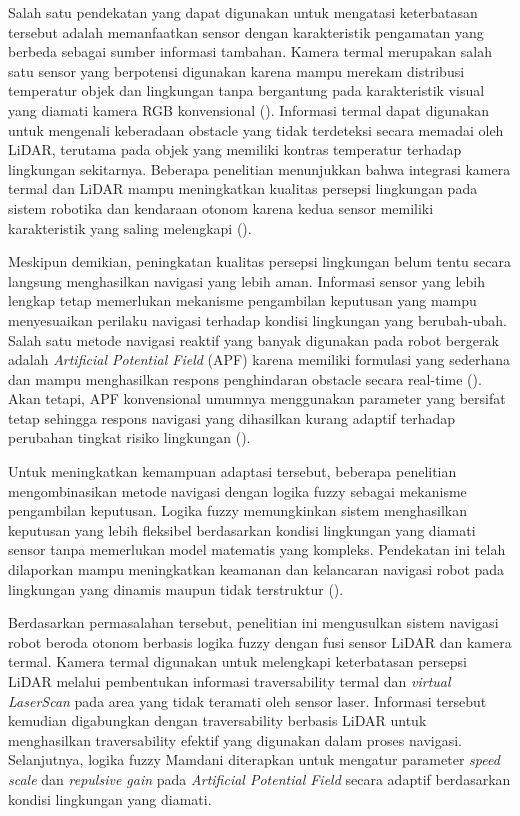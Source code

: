 Salah satu pendekatan yang dapat digunakan untuk mengatasi keterbatasan tersebut adalah memanfaatkan sensor dengan karakteristik pengamatan yang berbeda sebagai sumber informasi tambahan. Kamera termal merupakan salah satu sensor yang berpotensi digunakan karena mampu merekam distribusi temperatur objek dan lingkungan tanpa bergantung pada karakteristik visual yang diamati kamera RGB konvensional (\cite{Castro2016}). Informasi termal dapat digunakan untuk mengenali keberadaan obstacle yang tidak terdeteksi secara memadai oleh LiDAR, terutama pada objek yang memiliki kontras temperatur terhadap lingkungan sekitarnya. Beberapa penelitian menunjukkan bahwa integrasi kamera termal dan LiDAR mampu meningkatkan kualitas persepsi lingkungan pada sistem robotika dan kendaraan otonom karena kedua sensor memiliki karakteristik yang saling melengkapi (\cite{Choi2023,Schichler2025}).

Meskipun demikian, peningkatan kualitas persepsi lingkungan belum tentu secara langsung menghasilkan navigasi yang lebih aman. Informasi sensor yang lebih lengkap tetap mem\-erlukan mekanisme pengambilan keputusan yang mampu menyesuaikan perilaku navigasi terhadap kondisi lingkungan yang berubah-ubah. Salah satu metode navigasi reaktif yang banyak digunakan pada robot bergerak adalah \textit{Artificial Potential Field} (APF) karena memiliki formulasi yang sederhana dan mampu menghasilkan respons penghindaran obstacle secara real-time (\cite{Khatib1986}). Akan tetapi, APF konvensional umumnya menggunakan parameter yang bersifat tetap sehingga respons navigasi yang dihasilkan kurang adaptif terhadap perubahan tingkat risiko lingkungan (\cite{Lv2024}).

Untuk meningkatkan kemampuan adaptasi tersebut, beberapa penelitian mengombinasikan metode navigasi dengan logika fuzzy sebagai mekanisme pengambilan keputusan. Logika fuzzy memungkinkan sistem menghasilkan keputusan yang lebih fleksibel berdasarkan kondisi lingkungan yang diamati sensor tanpa memerlukan model matematis yang kompleks. Pendekatan ini telah dilaporkan mampu meningkatkan keamanan dan kelancaran navigasi robot pada lingkungan yang dinamis maupun tidak terstruktur (\cite{Haider2022,Benaicha2026}).

Berdasarkan permasalahan tersebut, penelitian ini mengusulkan sistem navigasi robot ber\-oda otonom berbasis logika fuzzy dengan fusi sensor LiDAR dan kamera termal. Kamera termal digunakan untuk melengkapi keterbatasan persepsi LiDAR melalui pembentukan informasi traversability termal dan \textit{virtual LaserScan} pada area yang tidak teramati oleh sensor laser. Informasi tersebut kemudian digabungkan dengan traversability berbasis LiDAR untuk menghasilkan traversability efektif yang digunakan dalam proses navigasi. Selanjutnya, logika fuzzy Mamdani diterapkan untuk mengatur parameter \textit{speed scale} dan \textit{repulsive gain} pada \textit{Artificial Potential Field} secara adaptif berdasarkan kondisi lingkungan yang diamati.


